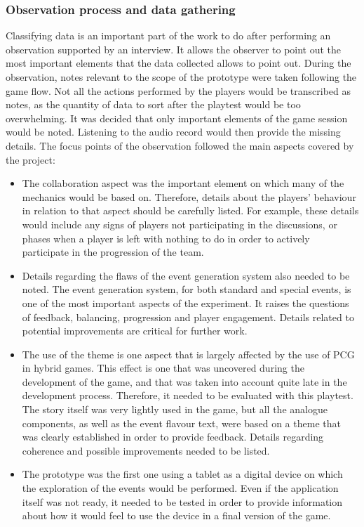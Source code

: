\subsubsection{Observation process and data gathering}
Classifying data is an important part of the work to do after performing an observation supported by an interview. It allows the observer to point out the most important elements that the data collected allows to point out. During the observation, notes relevant to the scope of the prototype were taken following the game flow. Not all the actions performed by the players would be transcribed as notes, as the quantity of data to sort after the playtest would be too overwhelming. It was decided that only important elements of the game session would be noted. Listening to the audio record would then provide the missing details. The focus points of the observation followed the main aspects covered by the project:
\begin{itemize}
\item The collaboration aspect was the important element on which many of the mechanics would be based on. Therefore, details about the players' behaviour in relation to that aspect should be carefully listed. For example, these details would include any signs of players not participating in the discussions, or phases when a player is left with nothing to do in order to actively participate in the progression of the team.
\item Details regarding the flaws of the event generation system also needed to be noted. The event generation system, for both standard and special events, is one of the most important aspects of the experiment. It raises the questions of feedback, balancing, progression and player engagement. Details related to potential improvements are critical for further work.
\item The use of the theme is one aspect that is largely affected by the use of PCG in hybrid games. This effect is one that was uncovered during the development of the game, and that was taken into account quite late in the development process. Therefore, it needed to be evaluated with this playtest. The story itself was very lightly used in the game, but all the analogue components, as well as the event flavour text, were based on a theme that was clearly established in order to provide feedback. Details regarding coherence and possible improvements needed to be listed.
\item The prototype was the first one using a tablet as a digital device on which the exploration of the events would be performed. Even if the application itself was not ready, it needed to be tested in order to provide information about how it would feel to use the device in a final version of the game. 
\end{itemize}

